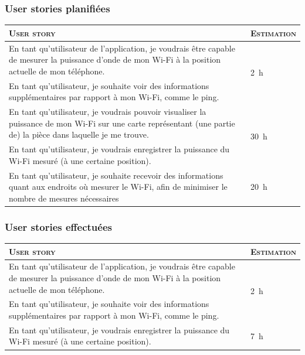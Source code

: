 \documentclass{elsarticle}
\newcommand{\est}[1]{\multirow{2}{*}{\SI{#1}{\hour}}}
\begin{document}
\subsubsection{User stories planifiées}
\begin{table}[H]
	\centering
	\begin{tabular}{p{14cm}m{2cm}}
		\toprule
		\textsc{User story} & \textsc{Estimation}\\
		\midrule
		En tant qu'utilisateur de l'application, je voudrais être capable de mesurer la puissance d'onde de mon Wi-Fi à la position actuelle de mon téléphone. & \est{2}\\
		\midrule
		En tant qu'utilisateur, je souhaite voir des informations supplémentaires par rapport à mon Wi-Fi, comme le ping. & \est{5}\\
		\midrule
		En tant qu'utilisateur, je voudrais pouvoir visualiser la puissance de mon Wi-Fi sur une carte représentant (une partie de) la pièce dans laquelle je me trouve. & \est{30}\\
		\midrule
		En tant qu'utilisateur, je voudrais enregistrer la puissance du Wi-Fi mesuré (à une certaine position). & \est{10}\\
		\midrule
		En tant qu'utilisateur, je souhaite recevoir des informations quant aux endroits où mesurer le Wi-Fi, afin de minimiser le nombre de mesures nécessaires & \est{20}\\
		\bottomrule
	\end{tabular}
\end{table}

\subsubsection{User stories effectuées}
\begin{table}[H]
	\centering
	\begin{tabular}{p{14cm}m{2cm}}
		\toprule
		\textsc{User story} & \textsc{Estimation}\\
		\midrule
		En tant qu'utilisateur de l'application, je voudrais être capable de mesurer la puissance d'onde de mon Wi-Fi à la position actuelle de mon téléphone. & \est{2}\\
		\midrule
		En tant qu'utilisateur, je souhaite voir des informations supplémentaires par rapport à mon Wi-Fi, comme le ping. & \est{8}\\
		\midrule
		En tant qu'utilisateur, je voudrais enregistrer la puissance du Wi-Fi mesuré (à une certaine position). & \est{7}\\
		\bottomrule
	\end{tabular}
\end{table}
\end{document}
